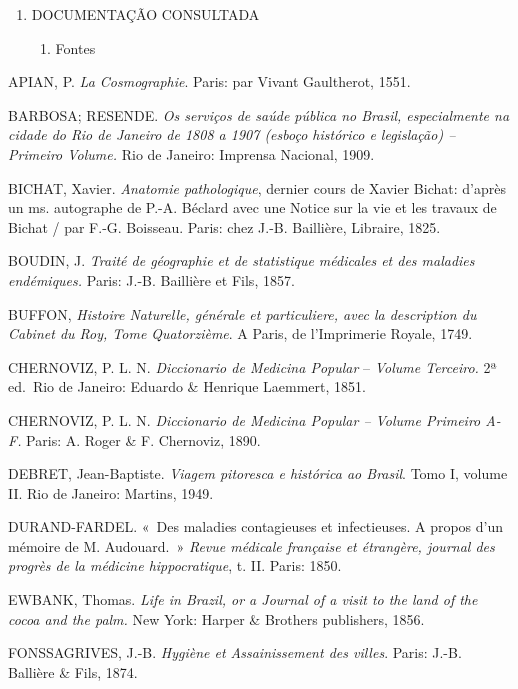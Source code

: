 \begin{enumerate}
\def\labelenumi{\arabic{enumi}.}
\setcounter{enumi}{5}
\item
  DOCUMENTAÇÃO CONSULTADA

  \begin{enumerate}
  \def\labelenumii{\arabic{enumii}.}
  \tightlist
  \item
    Fontes
  \end{enumerate}
\end{enumerate}

APIAN, P. \emph{La Cosmographie}. Paris: par Vivant Gaultherot, 1551.

BARBOSA; RESENDE. \emph{Os serviços de saúde pública no Brasil,
especialmente na cidade do Rio de Janeiro de 1808 a 1907 (esboço
histórico e legislação) -- Primeiro Volume.} Rio de Janeiro: Imprensa
Nacional, 1909.

BICHAT, Xavier. \emph{Anatomie pathologique}, dernier cours de Xavier
Bichat: d'après un ms. autographe de P.-A. Béclard avec une Notice sur
la vie et les travaux de Bichat / par F.-G. Boisseau. Paris: chez J.-B.
Baillière, Libraire, 1825.

BOUDIN, J. \emph{Traité de géographie et de statistique médicales et des
maladies endémiques.} Paris: J.-B. Baillière et Fils, 1857.

BUFFON, \emph{Histoire Naturelle, générale et particuliere, avec la
description du Cabinet du Roy, Tome Quatorzième}. A Paris, de
l'Imprimerie Royale, 1749.

CHERNOVIZ, P. L. N. \emph{Diccionario de Medicina Popular} --
\emph{Volume Terceiro.} 2ª ed.~Rio de Janeiro: Eduardo \& Henrique
Laemmert, 1851.

CHERNOVIZ, P. L. N. \emph{Diccionario de Medicina Popular -- Volume
Primeiro A-F.} Paris: A. Roger \& F. Chernoviz, 1890.

DEBRET, Jean-Baptiste. \emph{Viagem pitoresca e histórica ao Brasil}.
Tomo I, volume II. Rio de Janeiro: Martins, 1949.

DURAND-FARDEL. «~Des maladies contagieuses et infectieuses. A propos
d'un mémoire de M. Audouard.~» \emph{Revue médicale française et
étrangère, journal des progrès de la médicine hippocratique}, t. II.
Paris: 1850.

EWBANK, Thomas. \emph{Life in Brazil, or a Journal of a visit to the
land of the cocoa and the palm.} New York: Harper \& Brothers
publishers, 1856.

FONSSAGRIVES, J.-B. \emph{Hygiène et Assainissement des villes}. Paris:
J.-B. Ballière \& Fils, 1874.

